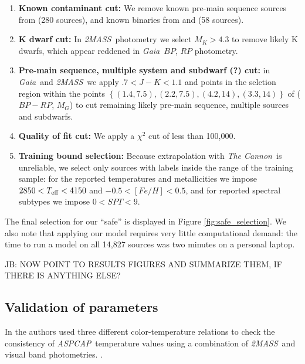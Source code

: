 \documentclass[modern]{aastex62}
\newcommand{\thecannon}{\textsl{The Cannon}}
\newcommand{\aspcap}{\textsl{ASPCAP}}
\newcommand{\gaia}{\textsl{Gaia}}
\newcommand{\zmass}{\textsl{2MASS}}
\begin{document}
\begin{enumerate}
\item \textbf{Known contaminant cut:} We remove known pre-main sequence sources from \citealt{Cottaar:2014} (280 sources), and known binaries from \citealt{ElBadry:2018} and \citealt{Skinner:2018} (58 sources).

\item \textbf{K dwarf cut:} In \zmass\ photometry we select $M_K > 4.3$ to remove likely K dwarfs, which appear reddened in \gaia\ $BP$, $RP$ photometry.

\item \textbf{Pre-main sequence, multiple system and subdwarf (?) cut:} in \gaia\ and \zmass\ we apply $.7<J-K<1.1$ and points in the selction region within the points $\left\{ (1.4, 7.5), (2.2, 7.5), (4.2, 14), (3.3, 14) \right\}$ of ($BP-RP$, $M_G$) to cut remaining likely pre-main sequence, multiple sources and subdwarfs.

\item \textbf{Quality of fit cut:} We apply a $\chi^2$ cut of less than 100,000.

\item \textbf{Training bound selection:} Because extrapolation with \thecannon\ is unreliable, we select only sources with labels inside the range of the training sample: for the reported temperatures and metallicities we impose $2850<T_{\rm eff}<4150$ and $-0.5<[Fe/H]<0.5$, and for reported spectral subtypes we impose $0<SPT<9$.
\end{enumerate}

The final selection for our ``safe'' is displayed in Figure \ref{fig:safe_selection}. We also note that applying our model requires very little computational demand: the time to run a model on all 14,827 sources was two minutes on a personal laptop.

JB: NOW POINT TO RESULTS FIGURES AND SUMMARIZE THEM, IF THERE IS ANYTHING ELSE?

\subsection{Validation of parameters}

In \citealt{Schmidt:2016} the authors used three different color-temperature relations to check the consistency of \aspcap\ temperature values using a combination of \zmass\ and visual band photometries. \color{black}. 
\end{document}
